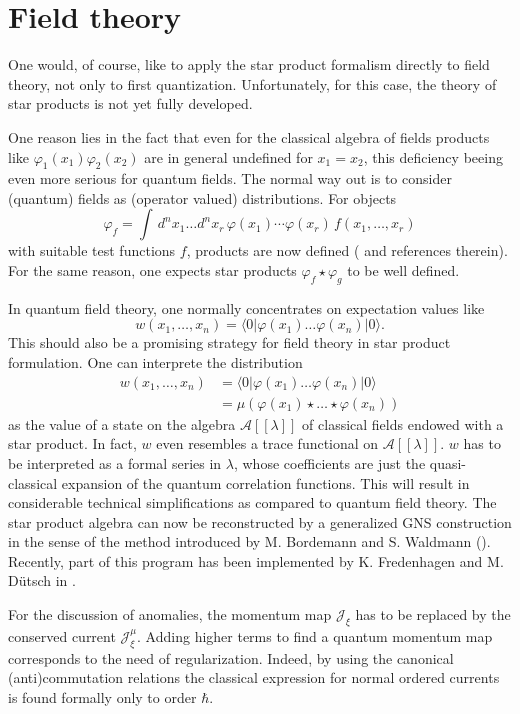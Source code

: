 \documentclass[a4paper,12pt]{article}
\begin{document}
\section{Field theory}

One would, of course, like to apply the star product formalism directly to field
theory, not only to first quantization. Unfortunately, for this case, the theory 
of star products is not yet fully developed.

One reason lies in the fact that even for the classical algebra of fields
products like $\varphi_1(x_1)\varphi_2(x_2)$ are in general undefined for
$x_1=x_2$, this deficiency beeing even more serious for quantum fields. The normal
way out is to consider (quantum) fields as (operator valued) distributions. For
objects 
\[
  \varphi_f
  =\int \,d^nx_1\ldots
  d^nx_r\,\varphi(x_1)\cdots\varphi(x_r)\,f(x_1,\ldots,x_r)
\]
with suitable test  
functions $f$, products 
are now defined (\cite{DF00} and references therein). 
For the same reason, one expects star products
$\varphi_f\star\varphi_g$ to be well defined.

In quantum field theory, one normally concentrates on expectation values like
\[
w(x_1,\ldots,x_n)=\langle0|\varphi(x_1)\ldots\varphi(x_n)|0\rangle.
\]
This should also be a promising strategy for field theory in star product
formulation. One can interprete the distribution
\begin{eqnarray*}
w(x_1,\ldots,x_n)&=\langle0|\varphi(x_1)\ldots\varphi(x_n)|0\rangle\\
&=\mu\left(\varphi(x_1)\star\ldots\star\varphi(x_n)\right)
\end{eqnarray*}
as the value of a state on the algebra $\mathcal A[[\lambda]]$ of classical
fields endowed with a star product. In fact, $w$ even resembles a trace
functional on $\mathcal A[[\lambda]]$. $w$ has to be interpreted as a formal
series in $\lambda$, whose coefficients are just the quasi-classical expansion of 
the quantum correlation functions. This will result in considerable technical
simplifications as compared to quantum field theory. 
The star product algebra can now be reconstructed by a generalized GNS
construction in the sense of the method introduced by M. Bordemann and
S. Waldmann (\cite{BW98}). Recently, part of this program has been implemented by
K. Fredenhagen and M. D\"utsch in \cite{DF00}.

For the discussion of anomalies, the momentum map $\mathcal J_\xi$ has to be
replaced by the conserved current $\mathcal J_\xi^\mu$. Adding higher
terms to find a quantum momentum map corresponds to the need of
regularization. Indeed, by using the canonical (anti)commutation relations
the classical expression for normal ordered currents is
found formally only to order $\hbar$.
\end{document}
